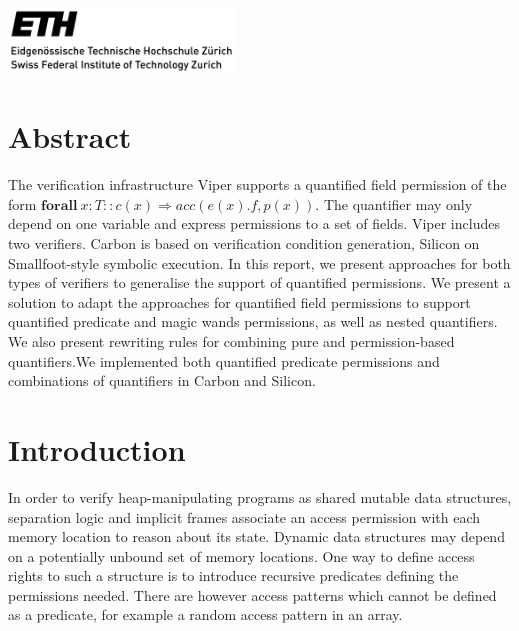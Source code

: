 \documentclass[12pt]{article}
\begin{document}
\clearpage
\newcommand*{\ident}{\hspace*{0.5cm}}
\newcommand{\wand}{\ensuremath{\mathbin{-\!\!*}}}

\maketitle
\includegraphics[width=6cm]{eth_logo_black.pdf}
\newpage

\clearpage
{}
\tableofcontents
\newpage
\clearpage
{}%
\section{Abstract}
The verification infrastructure Viper supports a quantified field permission of the form \(\mathbf{forall\ } x:T :: c(x) \Rightarrow acc(e(x).f, p(x))\). The quantifier may only depend on one variable and express permissions to a set of fields. Viper includes two verifiers. Carbon is based on verification condition generation, Silicon on Smallfoot-style symbolic execution. In this report, we present approaches for both types of verifiers to generalise the support of quantified permissions. We present a solution to adapt the approaches for quantified field permissions to support quantified predicate and magic wands permissions, as well as nested quantifiers. We also present rewriting rules for combining pure and permission-based quantifiers.We implemented both quantified predicate permissions and combinations of quantifiers in Carbon and Silicon.

\section{Introduction}
In order to verify heap-manipulating programs as shared mutable data structures, separation logic \cite{reynolds2002separation} and implicit frames \cite{smans2009implicit} associate an access permission with each memory location to reason about its state. 
Dynamic data structures may depend on a potentially unbound set of memory locations. One way to define access rights to such a structure is to introduce recursive predicates defining the permissions needed. There are however access patterns which cannot be defined as a predicate, for example a random access pattern in an array.
\end{document}
